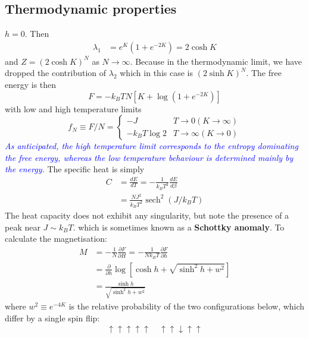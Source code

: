 \documentclass[12pt,titlepage]{article}
\numberwithin{equation}{section}
\begin{document}
\subsection{Thermodynamic properties}
 $h=0$. Then
\begin{equation}
\begin{aligned}  \lambda_{1} &=e^{K}\left(1+e^{-2 K}\right)=2 \cosh K \end{aligned}
\end{equation}
and $Z=(2 \cosh K)^{N}$ as $N \rightarrow \infty .$ Because in the thermodynamic limit, we have dropped the
contribution of $\lambda_{2}$ which in this case is $(2 \sinh K)^{N} .$ The free energy is then
\begin{equation}
F=-k_{B} T N\left[K+\log \left(1+e^{-2 K}\right)\right]
\end{equation}
with low and high temperature limits
\begin{equation}
f_{N} \equiv F / N=\left\{\begin{array}{ll}{-J} & {T \rightarrow 0(K \rightarrow \infty)} \\ {-k_{B} T \log 2} & {T \rightarrow \infty(K \rightarrow 0)}\end{array}\right.
\end{equation}
\textcolor{blue}{\emph{As anticipated, the high temperature limit corresponds to the entropy dominating the free energy, whereas the low temperature behaviour is determined mainly by the energy.}}
The specific heat is simply
\begin{equation}
\begin{aligned} C &=\frac{d E}{d T}=-\frac{1}{k_{B} T^{2}} \frac{d E}{d \beta} \\ &=\frac{N J^{2}}{k_{B} T^{2}} \operatorname{sech}^{2}\left(J / k_{B} T\right) \end{aligned}
\end{equation}
The heat capacity does not exhibit any singularity, but note the presence of a peak near $J \sim k_{B} T$. which is sometimes known as a \textbf{Schottky anomaly}.
To calculate the magnetisation:
\begin{equation}
\begin{aligned} M &=-\frac{1}{N} \frac{\partial F}{\partial H}=-\frac{1}{N k_{B} T} \frac{\partial F}{\partial h} \\ &=\frac{\partial}{\partial h} \log \left[\cosh h+\sqrt{\sinh ^{2} h+w^{2}}\right] \\ &=\frac{\sinh h}{\sqrt{\sinh ^{2} h+w^{2}}} \end{aligned}
\end{equation}
where $w^{2} \equiv e^{-4 K}$ is the relative probability of the two configurations below, which differ by a single spin flip:
\begin{align*}
\uparrow \uparrow \uparrow \uparrow \uparrow \quad \uparrow \uparrow \downarrow \uparrow \uparrow
\end{align*}
\end{document}
